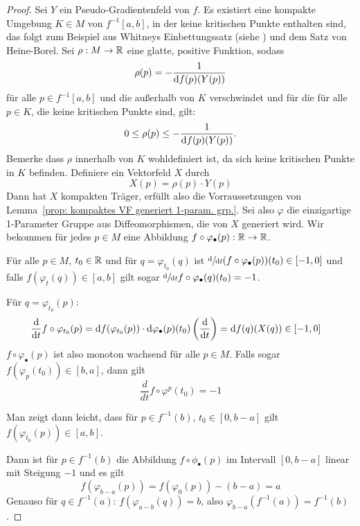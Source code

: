 \begin{proof}
    Sei $Y$ ein Pseudo-Gradientenfeld von $f$. Es existiert eine kompakte Umgebung $K \in M$ von 
    $f^{-1}[a, b]$, in der keine kritischen Punkte enthalten sind, das folgt zum Beispiel aus 
    Whitneys Einbettungssatz (siehe \cite{whitney}) und dem Satz von Heine-Borel. 
    Sei $\rho: M \to { \mathbb R }$ eine glatte, 
    positive Funktion, sodass
    \[ \rho(p) = - \frac{1}{{ \operatorname{d} } f (p) (Y (p))} \]
    für alle $p \in f^{-1}[a, b]$ und die außerhalb von $K$ verschwindet und für
    die für alle $p \in K$, die keine kritischen Punkte sind, gilt: 
    \[ 0 \leq \rho(p) \leq - \frac{1}{{ \operatorname{d} } f (p) (Y (p))} . \]
    Bemerke dass $\rho$ innerhalb von $K$ wohldefiniert ist, da sich keine kritischen Punkte in $K$ 
    befinden. Definiere ein Vektorfeld $X$ durch
    \[ X(p) = \rho(p) \cdot Y (p) \]
    Dann hat $X$ kompakten Träger, erfüllt also die Vorraussetzungen von 
    Lemma~\ref{prop: kompaktes VF generiert 1-param. grp.}. Sei also $\varphi$ die
    einzigartige 1-Parameter Gruppe aus Diffeomorphismen, die von $X$ generiert
    wird. 
    Wir bekommen für jedes $p \in M$ eine Abbildung 
    $f \circ \varphi_{\bullet}(p): { \mathbb R } \to { \mathbb R }$.
    
    \begin{claim*} 
        Für alle $p \in M$, $t_0 \in { \mathbb R }$ und für $q = \varphi_{t_0}(q)$
        ist $\derive{t} (f \circ \varphi_{\bullet}(p)) (t_0) \in [-1, 0]$ und falls 
        $f(\varphi_t(q)) \in [a, b]$ gilt sogar $\derive{t} f \circ \varphi_{\bullet}(q) (t_0) = -1$.
    \end{claim*}

    \begin{smallproof}
        Für $q = \varphi_{t_0}(p)$:
        \begin{align*}
            \derive{t} f \circ \varphi_{t_0}(p)
            & = \opd f (\varphi_{t_0}(p)) \cdot \opd \varphi_{\bullet}(p) (t_0) 
                \left( \derive{t} \right)
            = \opd f (q) ( X(q) ) \in [-1, 0]
        \end{align*}
        $f \circ \varphi_{\bullet}(p)$ ist also monoton wachsend für alle $p \in M$.
        Falls sogar $f(\varphi_p(t_0)) \in [b, a]$, dann gilt
        \[ \frac{d}{dt} f \circ \varphi^p (t_0) = -1 \]
    \end{smallproof}

    Man zeigt dann leicht, dass für $p \in f^{-1}(b)$, $t_0 \in [0, b - a]$ gilt 
    $f(\varphi_{t_0}(p)) \in [a, b]$.

    Dann ist für $p \in f^{-1}(b)$ die Abbildung $f \circ \phi_{\bullet}(p)$ im Intervall $
    [0, b - a]$ linear mit Steigung $- 1$ und es gilt 
    \[ f(\varphi_{b - a}(p)) = f(\varphi_{0}(p)) - (b - a) = a \]
    Genauso für $q \in f^{-1}(a)$: $f(\varphi_{a - b}(q)) = b$, also 
    $\varphi_{b - a}(f^{-1}(a)) = f^{-1}(b)$.


\end{proof}
